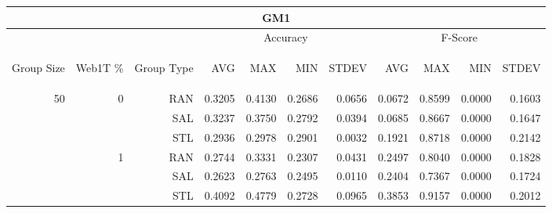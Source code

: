 \begin{center}
\begin{table}[htbp] 
 \begin{center}
\begin{tabular}{ | r | r | r | r | r | r | r | r | r | r | r |}
\hline
\multicolumn{11}{|c|}{GM1}\\
\hline
 & & & \multicolumn{4}{|c|}{Accuracy} & \multicolumn{4}{|c|}{F-Score}\\ \cline{4-11}
\begin{sideways}Group Size\end{sideways} & \begin{sideways}Web1T \%\end{sideways} & \begin{sideways}Group Type\end{sideways} & \begin{sideways}AVG\end{sideways} & \begin{sideways}MAX\end{sideways} & \begin{sideways}MIN\end{sideways} & \begin{sideways}STDEV\end{sideways} & \begin{sideways}AVG\end{sideways} & \begin{sideways}MAX\end{sideways} & \begin{sideways}MIN\end{sideways} & \begin{sideways}STDEV\end{sideways}\\
\hline
\multirow{18}{*}{50}
 & \multirow{3}{*}{0} & RAN & 0.3205 & 0.4130 & 0.2686 & 0.0656 & 0.0672 & 0.8599 & 0.0000 & 0.1603\\ \cline{3-11}
 &   & SAL & 0.3237 & 0.3750 & 0.2792 & 0.0394 & 0.0685 & 0.8667 & 0.0000 & 0.1647\\ \cline{3-11}
 &   & STL & 0.2936 & 0.2978 & 0.2901 & 0.0032 & 0.1921 & 0.8718 & 0.0000 & 0.2142\\ \cline{2-11}
 & \multirow{3}{*}{1} & RAN & 0.2744 & 0.3331 & 0.2307 & 0.0431 & 0.2497 & 0.8040 & 0.0000 & 0.1828\\ \cline{3-11}
 &   & SAL & 0.2623 & 0.2763 & 0.2495 & 0.0110 & 0.2404 & 0.7367 & 0.0000 & 0.1724\\ \cline{3-11}
 &   & STL & 0.4092 & 0.4779 & 0.2728 & 0.0965 & 0.3853 & 0.9157 & 0.0000 & 0.2012\\ \cline{2-11}

\end{tabular}
\end{center}
\end{table}
\end{center}
